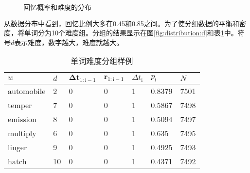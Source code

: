 \begin{figure}[htbp]
    \setlength{\subfigcapskip}{-1bp}
    \centering
    \begin{minipage}{\textwidth}
    \centering
    \subfigure{\label{fig:distribution:p}}\addtocounter{subfigure}{-2}
    \hspace{2em}
    \subfigure{\label{fig:distribution:d}}\addtocounter{subfigure}{-2}
    \end{minipage}
    \caption{回忆概率和难度的分布}
    \label{fig:distribution}
\end{figure}

从数据分布中看到，回忆比例大多在0.45和0.85之间。为了使分组数据的平衡和密度，将单词分为10个难度组。分组的结果显示在图\ref{fig:distribution:d}和表\ref{tab:difficulty}中。符号$d$表示难度，数字越大，难度就越大。

\begin{table}[htbp]
    \caption{单词难度分组样例}
    \label{tab:difficulty}
    \vspace{0.5em}\centering\wuhao
    \begin{tabular}{lllllll}
    \toprule[1.5pt]
    $w$          & $d$  & $\bm{\Delta t}_\mathrm{1:i-1}$ & $\bm r_\mathrm{1:i-1}$& $\Delta t_\mathrm{i}$ & $p_\mathrm{i}$& $N$ \\ 
    \midrule[1pt]
    automobile & 2  & 0          & 0          & 1        & 0.8379    & 7501       \\
    temper     & 7  & 0          & 0          & 1        & 0.5867    & 7498       \\
    emission   & 8  & 0          & 0          & 1        & 0.5094    & 7497       \\
    multiply   & 6  & 0          & 0          & 1        & 0.635     & 7495       \\
    linger     & 9  & 0          & 0          & 1        & 0.4925    & 7493       \\
    hatch      & 10 & 0          & 0          & 1        & 0.4371    & 7492       \\ 
    \bottomrule[1.5pt]
    \end{tabular}
\end{table}

